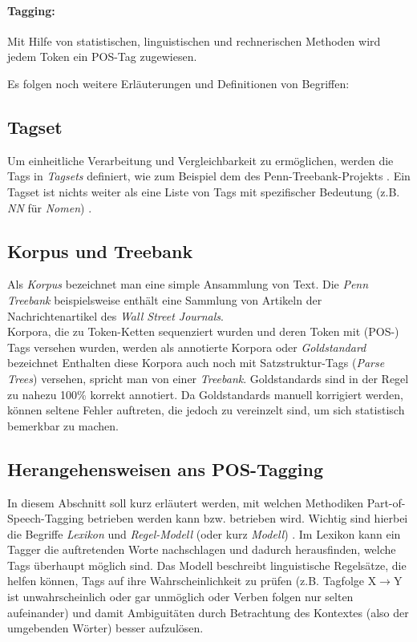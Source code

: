\paragraph{Tagging:} Mit Hilfe von statistischen, linguistischen und rechnerischen Methoden wird jedem Token ein POS-Tag zugewiesen. 

Es folgen noch weitere Erläuterungen und Definitionen von Begriffen:

\subsection{Tagset}
\label{sec:related:pos:tagset}

Um einheitliche Verarbeitung und Vergleichbarkeit zu ermöglichen, werden die Tags in \textit{Tagsets} definiert, wie zum Beispiel dem des Penn-Treebank-Projekts \linebreak \cite{Web:PennBank} \cite{Paper:PennBank}. Ein Tagset ist nichts weiter als eine Liste von Tags mit spezifischer Bedeutung (z.B. \textit{NN} für \textit{Nomen}) \cite{halteren}.

\subsection{Korpus und Treebank}
\label{sec:related:pos:corpus}

Als \textit{Korpus} bezeichnet man eine simple Ansammlung von Text. Die \textit{Penn Treebank} \cite{Paper:PennBank} beispielsweise enthält eine Sammlung von Artikeln der Nachrichtenartikel des \textit{Wall Street Journals}.
\\
Korpora, die zu Token-Ketten sequenziert wurden und deren Token mit (POS-) Tags versehen wurden, werden als annotierte Korpora oder \textit{Goldstandard} bezeichnet \cite{halteren} Enthalten diese Korpora auch noch mit Satzstruktur-Tags (\textit{Parse Trees}) versehen, spricht man von einer \textit{Treebank}. Goldstandards sind in der Regel zu nahezu 100\% korrekt annotiert. Da Goldstandards manuell korrigiert werden, können seltene Fehler auftreten, die jedoch zu vereinzelt sind, um sich statistisch bemerkbar zu machen.

\subsection{Herangehensweisen ans POS-Tagging}
In diesem Abschnitt soll kurz erläutert werden, mit welchen Methodiken Part-of-Speech-Tagging betrieben werden kann bzw. betrieben wird. Wichtig sind hierbei die Begriffe \textit{Lexikon} und \textit{Regel-Modell} (oder kurz \textit{Modell}) \cite{Smith} \cite{Eynde}. Im Lexikon kann ein Tagger die auftretenden Worte nachschlagen und dadurch herausfinden, welche Tags überhaupt möglich sind. Das Modell beschreibt linguistische Regelsätze, die helfen können, Tags auf ihre Wahrscheinlichkeit zu prüfen (z.B. \glqq Tagfolge X$\rightarrow$Y ist unwahrscheinlich oder gar unmöglich\grqq{} oder \glqq Verben folgen nur selten aufeinander\grqq{}) und damit Ambiguitäten durch Betrachtung des Kontextes (also der umgebenden Wörter) besser aufzulösen.


